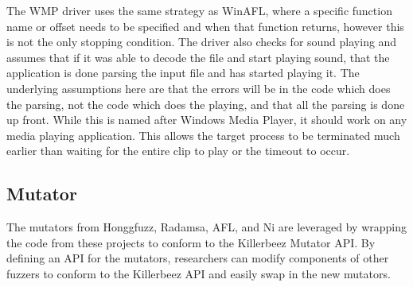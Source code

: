 The WMP driver uses the same strategy as WinAFL, where a specific function
name or offset needs to be specified and when that function returns, however
this is not the only stopping condition. The driver also checks for sound
playing and assumes that if it was able to decode the file and start playing
sound, that the application is done parsing the input file and has started
playing it. The underlying assumptions here are that the errors will be in the
code which does the parsing, not the code which does the playing, and that all
the parsing is done up front.  While this is named after Windows Media Player,
it should work on any media playing application.  This allows the target
process to be terminated much earlier than waiting for the entire clip to
play or the timeout to occur.

\subsection{Mutator} \label{Mutator}
The mutators from Honggfuzz, Radamsa, AFL, and Ni are leveraged by wrapping the
code from these projects to conform to the Killerbeez Mutator API. By
defining an API for the mutators, researchers can modify components of other
fuzzers to conform to the Killerbeez API and easily swap in the new mutators.

